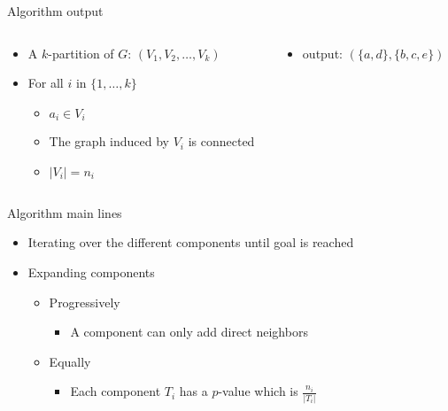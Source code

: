 \begin{frame}{Algorithm output}
  \begin{columns}[c]
    \begin{column}[T]{.5\textwidth}
      \begin{itemize}
      \item A $k$-partition of $G$: $(V_1,V_2, \dots, V_k)$
      \item For all $i$ in $\{1, \dots, k\}$
        \begin{itemize}
        \item $a_i \in V_i$
        \item The graph induced by $V_i$ is connected
        \item $|V_i| = n_i$
        \end{itemize}
      \end{itemize}
    \end{column}
    \begin{column}[T]{.5\textwidth}
      \begin{itemize}
      \item output: $(\{a,d\},\{b,c,e\})$
      \end{itemize}
      \begin{tikzpicture}[scale=0.5]
        
      \end{tikzpicture}
    \end{column}
  \end{columns}
\end{frame}


\begin{frame}{Algorithm main lines}
  \begin{itemize}
  \item Iterating over the different components until goal is reached
  \item Expanding components
    \begin{itemize}
    \item Progressively
      \begin{itemize}
      \item A component can only add direct neighbors
      \end{itemize}
    \item Equally
      \begin{itemize}
      \item Each component $T_i$ has a $p$-value which is $\frac{n_i}{|T_i|}$
      \end{itemize}
    \end{itemize}
  \end{itemize}
  \begin{center}
  \end{center}
\end{frame}

